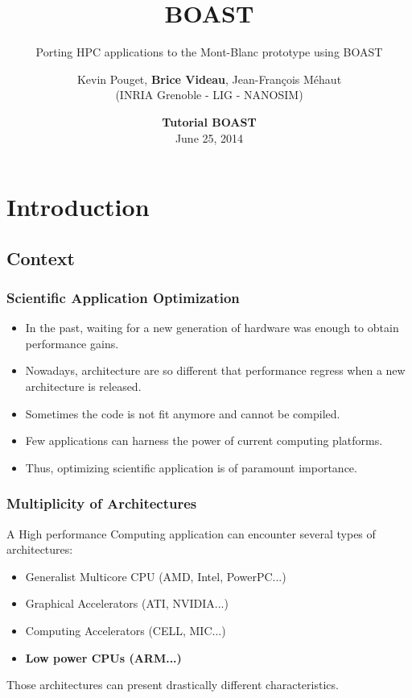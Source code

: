 \documentclass{beamer}
\title{BOAST}
\subtitle{Porting HPC applications to the Mont-Blanc prototype using BOAST }
\author{Kevin Pouget, \textbf{Brice Videau}, Jean-François Méhaut\\
(INRIA Grenoble - LIG - NANOSIM)}
\date{\textbf{Tutorial BOAST}\\June 25, 2014}
\begin{document}
\frame{\titlepage}

\section{Introduction}


\subsection{Context}

\begin{frame}
    \frametitle{Scientific Application Optimization}
\begin{itemize}
\item In the past, waiting for a new generation of hardware was enough to obtain performance gains.
\item Nowadays, architecture are so different that performance regress when a new architecture is released.
\item Sometimes the code is not fit anymore and cannot be compiled.
\item Few applications can harness the power of current computing platforms.
\item Thus, optimizing scientific application is of paramount importance.
\end{itemize}
\end{frame}

\begin{frame}
\frametitle{Multiplicity of Architectures}
A High performance Computing application can encounter several types of architectures:
\begin{itemize}
\item Generalist Multicore CPU (AMD, Intel, PowerPC...)
\item Graphical Accelerators (ATI, NVIDIA...)
\item Computing Accelerators (CELL, MIC...)
\item \textbf{Low power CPUs (ARM...)}
\end{itemize}
Those architectures can present drastically different characteristics.
\end{frame}
\end{document}
